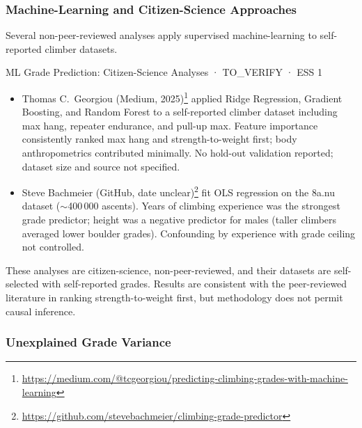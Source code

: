 \subsubsection{Machine-Learning and Citizen-Science Approaches}

Several non-peer-reviewed analyses apply supervised machine-learning to self-reported climber datasets.

\begin{folklorebox}{ML Grade Prediction: Citizen-Science Analyses · TO\_VERIFY · ESS 1}
\begin{itemize}
  \item Thomas C.\ Georgiou (Medium, 2025)\footnote{\url{https://medium.com/@tcgeorgiou/predicting-climbing-grades-with-machine-learning}} applied Ridge Regression, Gradient Boosting, and Random Forest to a self-reported climber dataset including max hang, repeater endurance, and pull-up max. Feature importance consistently ranked max hang and strength-to-weight first; body anthropometrics contributed minimally. No hold-out validation reported; dataset size and source not specified.
  \item Steve Bachmeier (GitHub, date unclear)\footnote{\url{https://github.com/stevebachmeier/climbing-grade-predictor}} fit OLS regression on the 8a.nu dataset ($\sim$400\,000 ascents). Years of climbing experience was the strongest grade predictor; height was a negative predictor for males (taller climbers averaged lower boulder grades). Confounding by experience with grade ceiling not controlled.
\end{itemize}
These analyses are citizen-science, non-peer-reviewed, and their datasets are self-selected with self-reported grades. Results are consistent with the peer-reviewed literature in ranking strength-to-weight first, but methodology does not permit causal inference.
\end{folklorebox}

\subsubsection{Unexplained Grade Variance}

